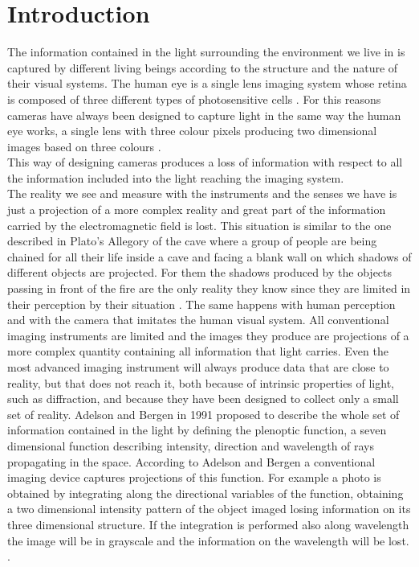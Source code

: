 \chapter*{Introduction}
\label{intro}
The information contained in the light surrounding the environment we live in is captured by different living beings according to the structure and the nature of their visual systems. The human eye is a single lens imaging system whose retina is composed of three different types of photosensitive cells \cite{hart1992adler}. For this reasons cameras have always been designed to capture light in the same way the human eye works, a single lens with three colour pixels producing two dimensional images based on three colours \cite{wetzstein2011computational}. \\
This way of designing cameras produces a loss of information with respect to all the information included into the light reaching the imaging system.\\
 The reality we see and measure with the instruments and the senses we have is just a projection of a more complex reality and great part of the information carried by the electromagnetic field is lost. This situation is similar to the one described in Plato's Allegory of the cave where a group of people are being chained for all their life inside a cave and facing a blank wall on which shadows of different objects are projected. For them the shadows produced by the objects passing in front of the fire are the only reality they know since they are limited in their perception by their situation \cite{plato1945republic} . The same happens with human perception and with the camera that imitates the human visual system. All conventional imaging instruments are limited and the images they produce are projections of a more complex quantity containing all information that light carries. Even the most advanced imaging instrument will always produce data that are close to reality, but that does not reach it, both because of intrinsic properties of light, such as diffraction, and because they have been designed to collect only a small set of reality. 
 Adelson and Bergen \cite{adelson1991plenoptic} in 1991 proposed to describe the whole set of information contained in the light by defining the plenoptic function, a seven dimensional function describing intensity, direction and wavelength of rays propagating in the space. According to Adelson and Bergen a conventional imaging device captures projections of this function. For example a photo is obtained by integrating along the directional variables of the function, obtaining a two dimensional intensity pattern of the object imaged losing information on its three dimensional structure. If the integration is performed also along wavelength the image will be in grayscale and the information on the wavelength will be lost. \cite{adelson1992single,ng2006digital}.
